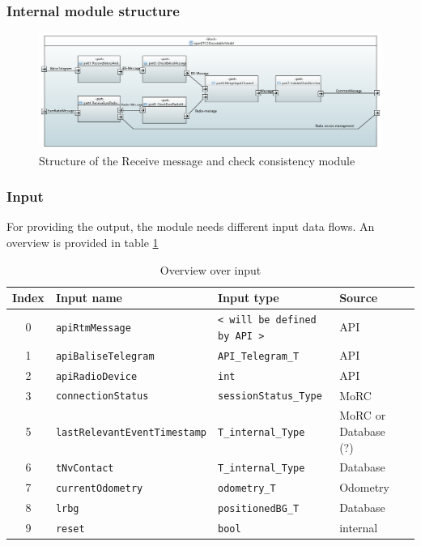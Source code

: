 \documentclass{template/openetcs_report}
\begin{document}
\subsubsection{Internal module structure}
\begin{figure}[H]
 \centering
 \includegraphics[width=\textwidth]{./images/Input-Messages4.PNG}
 \caption{Structure of the Receive message and check consistency module}
 \label{fig:receiveAndCheckConsistencyArch}
\end{figure}
 
\subsubsection{Input}
For providing the output, the module needs different input data flows. An overview is provided in table \ref{tbl:ReceiveMessageAndCheckConsistencyInput}

\begin{table}[H]
  \begin{tabular}{| c | l | l | l | l |}
    \hline
    \textbf{Index} & \textbf{Input name} & \textbf{Input type} & \textbf{Source}\\ \hline
    0 & \texttt{apiRtmMessage} & \texttt{< will be defined by API >} & API \\
    1 & \texttt{apiBaliseTelegram} & \texttt{API\_Telegram\_T} & API\\
    2 & \texttt{apiRadioDevice} & \texttt{int} & API\\
    3 & \texttt{connectionStatus} & \texttt{sessionStatus\_Type} & MoRC\\
    5 & \texttt{lastRelevantEventTimestamp} & \texttt{T\_internal\_Type} & MoRC or Database (?)\\
    6 & \texttt{tNvContact} & \texttt{T\_internal\_Type} & Database\\
    7 & \texttt{currentOdometry} & \texttt{odometry\_T} & Odometry\\
    8 & \texttt{lrbg} & \texttt{positionedBG\_T} & Database\\
    9 & \texttt{reset} & \texttt{bool} & internal\\
    \hline
  \end{tabular} 
  \caption{Overview over input}
  \label{tbl:ReceiveMessageAndCheckConsistencyInput}
\end{table}
\end{document}
